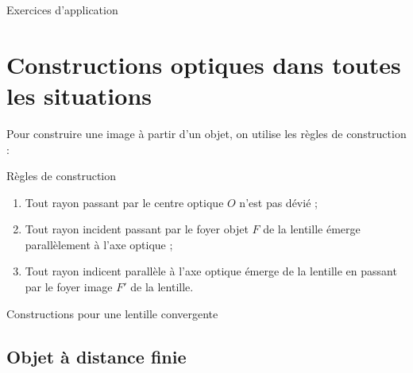 \documentclass[10pt,a5paper,notitlepage]{book}
\begin{document}
\begin{center}
    \Huge Exercices d'application
\end{center}

\section{Constructions optiques dans toutes les situations}
Pour construire une image à partir d'un objet, on utilise les règles de
construction :

\begin{defi}[label = rconst]{Règles de construction}
    \begin{enumerate}
        \item Tout rayon passant par le centre optique $O$ n'est pas dévié ;
        \item Tout rayon incident passant par le foyer objet $F$ de la lentille
            émerge parallèlement à l'axe optique ;
        \item Tout rayon indicent parallèle à l'axe optique émerge de la
            lentille en passant par le foyer image $F'$ de la lentille.
    \end{enumerate}
\end{defi}

\pagebreak

\begin{center}
    \huge Constructions pour une lentille convergente
\end{center}

\subsection{Objet à distance finie}
\end{document}
